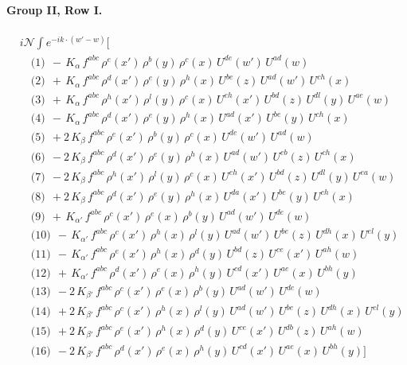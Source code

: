 \documentclass[10pt]{article}
\numberwithin{equation}{section}
\newcommand{\NN}{\mathcal N}
\begin{document}
\paragraph{Group II, Row I.}
\begin{align*}
&i\NN\int e^{-ik\cdot(w'-w)}\Big[\\
&\quad\text{(1)}\ \ -\,K_{\alpha}\,f^{abc}\,\rho^{e}(x')\,\rho^{b}(y)\,\rho^{c}(x)\,U^{de}(w')\,U^{ad}(w)\\
&\quad\text{(2)}\ \ +\,K_{\alpha}\,f^{abc}\,\rho^{d}(x')\,\rho^{e}(y)\,\rho^{h}(x)\,U^{be}(z)\,U^{ad}(w')\,U^{ch}(x)\\
&\quad\text{(3)}\ \ +\,K_{\alpha}\,f^{abc}\,\rho^{h}(x')\,\rho^{l}(y)\,\rho^{c}(x)\,U^{eh}(x')\,U^{bd}(z)\,U^{dl}(y)\,U^{ae}(w)\\
&\quad\text{(4)}\ \ -\,K_{\alpha}\,f^{abc}\,\rho^{d}(x')\,\rho^{e}(y)\,\rho^{h}(x)\,U^{ad}(x')\,U^{be}(y)\,U^{ch}(x)\\
&\quad\text{(5)}\ \ +2\,K_{\beta}\,f^{abc}\,\rho^{e}(x')\,\rho^{b}(y)\,\rho^{c}(x)\,U^{de}(w')\,U^{ad}(w)\\
&\quad\text{(6)}\ \ -2\,K_{\beta}\,f^{abc}\,\rho^{d}(x')\,\rho^{e}(y)\,\rho^{h}(x)\,U^{ad}(w')\,U^{eb}(z)\,U^{ch}(x)\\
&\quad\text{(7)}\ \ -2\,K_{\beta}\,f^{abc}\,\rho^{h}(x')\,\rho^{l}(y)\,\rho^{c}(x)\,U^{eh}(x')\,U^{bd}(z)\,U^{dl}(y)\,U^{ea}(w)\\
&\quad\text{(8)}\ \ +2\,K_{\beta}\,f^{abc}\,\rho^{d}(x')\,\rho^{e}(y)\,\rho^{h}(x)\,U^{da}(x')\,U^{be}(y)\,U^{ch}(x)\\
&\quad\text{(9)}\ \ +\,K_{\alpha'}\,f^{abc}\,\rho^{c}(x')\,\rho^{e}(x)\,\rho^{b}(y)\,U^{ad}(w')\,U^{de}(w)\\
&\quad\text{(10)}\ \ -\,K_{\alpha'}\,f^{abc}\,\rho^{c}(x')\,\rho^{h}(x)\,\rho^{l}(y)\,U^{ad}(w')\,U^{be}(z)\,U^{dh}(x)\,U^{el}(y)\\
&\quad\text{(11)}\ \ -\,K_{\alpha'}\,f^{abc}\,\rho^{e}(x')\,\rho^{h}(x)\,\rho^{d}(y)\,U^{bd}(z)\,U^{ce}(x')\,U^{ah}(w)\\
&\quad\text{(12)}\ \ +\,K_{\alpha'}\,f^{abc}\,\rho^{d}(x')\,\rho^{e}(x)\,\rho^{h}(y)\,U^{cd}(x')\,U^{ae}(x)\,U^{bh}(y)\\
&\quad\text{(13)}\ \ -2\,K_{\beta'}\,f^{abc}\,\rho^{c}(x')\,\rho^{e}(x)\,\rho^{b}(y)\,U^{ad}(w')\,U^{de}(w)\\
&\quad\text{(14)}\ \ +2\,K_{\beta'}\,f^{abc}\,\rho^{c}(x')\,\rho^{h}(x)\,\rho^{l}(y)\,U^{ad}(w')\,U^{be}(z)\,U^{dh}(x)\,U^{el}(y)\\
&\quad\text{(15)}\ \ +2\,K_{\beta'}\,f^{abc}\,\rho^{e}(x')\,\rho^{h}(x)\,\rho^{d}(y)\,U^{ce}(x')\,U^{db}(z)\,U^{ah}(w)\\
&\quad\text{(16)}\ \ -2\,K_{\beta'}\,f^{abc}\,\rho^{d}(x')\,\rho^{e}(x)\,\rho^{h}(y)\,U^{cd}(x')\,U^{ae}(x)\,U^{bh}(y)\Big]
\end{align*}
\end{document}
